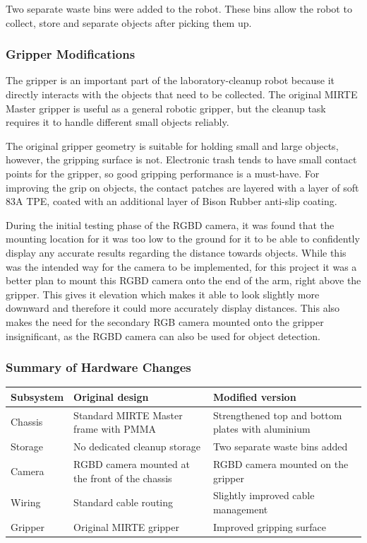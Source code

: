 Two separate waste bins were added to the robot. These bins allow the robot to collect, store and separate objects after picking them up.

\subsubsection{Gripper Modifications}

The gripper is an important part of the laboratory-cleanup robot because it directly interacts with the objects that need to be collected. The original MIRTE Master gripper is useful as a general robotic gripper, but the cleanup task requires it to handle different small objects reliably.

The original gripper geometry is suitable for holding small and large objects, however, the gripping surface is not. Electronic trash tends to have small contact points for the gripper, so good gripping performance is a must-have. For improving the grip on objects, the contact patches are layered with a layer of soft 83A TPE, coated with an additional layer of Bison Rubber anti-slip coating.

During the initial testing phase of the RGBD camera, it was found that the mounting location for it was too low to the ground for it to be able to confidently display any accurate results regarding the distance towards objects. While this was the intended way for the camera to be implemented, for this project it was a better plan to mount this RGBD camera onto the end of the arm, right above the gripper. This gives it elevation which makes it able to look slightly more downward and therefore it could more accurately display distances. This also makes the need for the secondary RGB camera mounted onto the gripper insignificant, as the RGBD camera can also be used for object detection.

\subsubsection{Summary of Hardware Changes}

\bigskip\noindent
\begin{tabular}{p{}p{}p{}}
\toprule
Subsystem & Original design & Modified version \\
\hline
Chassis & Standard MIRTE Master frame with PMMA & Strengthened top and bottom plates with aluminium \\
Storage & No dedicated cleanup storage & Two separate waste bins added \\
Camera & RGBD camera mounted at the front of the chassis & RGBD camera mounted on the gripper \\
Wiring & Standard cable routing & Slightly improved cable management \\
Gripper & Original MIRTE gripper & Improved gripping surface \\
\bottomrule
\end{tabular}

